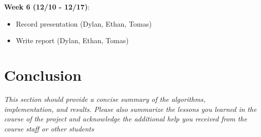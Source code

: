 \documentclass[10pt]{article}
\begin{document}
\noindent \textbf{Week 6 (12/10 - 12/17)}:
\begin{itemize}
  \item Record presentation (Dylan, Ethan, Tomas)
  \item Write report (Dylan, Ethan, Tomas)
\end{itemize}

\section{Conclusion}

\textit{This section should provide a concise summary of the algorithms, implementation, and results. Please also summarize the lessons you learned in the course of
the project and acknowledge the additional help you received from the course staff or other students}
\end{document}
